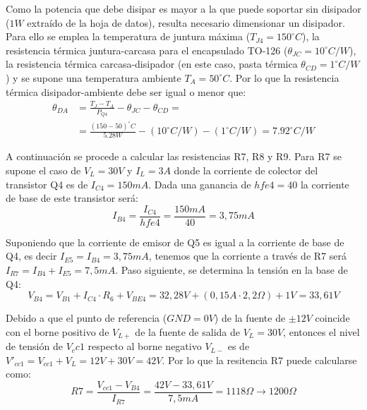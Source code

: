 Como la potencia que debe disipar es mayor a la que puede soportar sin disipador ($1 W$ extraído de la hoja de datos), resulta necesario dimensionar un disipador. Para ello se emplea la temperatura de juntura máxima ($T_{J4}=150^\circ C$), la resistencia térmica juntura-carcasa para el encapsulado TO-126 ($\theta _{JC}=10^\circ C/W$), la resistencia térmica carcasa-disipador (en este caso, pasta térmica $\theta _{CD}=1^\circ C/W$) y se supone una temperatura ambiente $T_A=50^\circ C$. Por lo que la resistencia térmica disipador-ambiente debe ser igual o menor que:
\begin{equation}
\begin{split}
\theta_{DA} &= \frac{T_J-T_A}{P_{Q4}}-\theta_{JC}-\theta_{CD}=\\
&= \frac{(150-50)^\circ C}{5.28W}-(10^\circ C/W)-(1^\circ C/W)=7.92^\circ C/W
\end{split}
\end{equation} \par
 
A continuación se procede a calcular las resistencias R7, R8 y R9. Para R7 se supone el caso de $V_L=30 V$ y $I_L=3 A$ donde la corriente de colector del transistor Q4 es de $I_{C4}=150 mA$. Dada una ganancia de $hfe4=40$ la corriente de base de este transistor será:
\begin{equation}
I_{B4}=\frac{I_{C4}}{hfe4}=\frac{150mA}{40}=3,75mA
\end{equation}\par

Suponiendo que la corriente de emisor de Q5 es igual a la corriente de base de Q4, es decir $I_{E5}=I_{B4}=3,75mA$, tenemos que la corriente a través de R7 será $I_{R7}=I_{B4}+I_{E5}=7,5mA$. Paso siguiente, se determina la tensión en la base de Q4:
\begin{equation}
V_{B4}=V_{B1}+I_{C4}\cdot R_6+V_{BE4}=32,28V+(0,15A\cdot 2,2\Omega)+1V=33,61V
\end{equation}\par

Debido a que el punto de referencia ($GND=0V$) de la fuente de $\pm 12V$ coincide con el borne positivo de $V_{L+}$ de la fuente de salida de $V_L=30V$, entonces el nivel de tensión de $V_cc1$ respecto al borne negativo $V_{L-}$ es de $V'_{cc1}=V_{cc1}+V_L=12V+30V=42V$. Por lo que la resitencia R7 puede calcularse como:
\begin{equation}
R7=\frac{V_{cc1}-V_{B4}}{I_{R7}}=\frac{42V-33,61V}{7,5 mA}=1118 \Omega \to 1200\Omega
\end{equation}\par 

